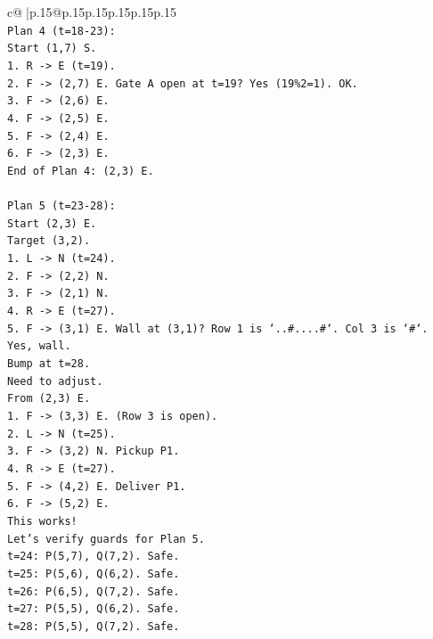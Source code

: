 \documentclass{article}
\begin{document}
{\begin{supertabular}{c@{$\;$}|p{.15\linewidth}@{}p{.15\linewidth}p{.15\linewidth}p{.15\linewidth}p{.15\linewidth}p{.15\linewidth}}
{{{\\ 
\texttt{Plan 4 (t=18{-}23):} \\
\texttt{Start (1,7) S.} \\
\texttt{1. R {-}> E (t=19).} \\
\texttt{2. F {-}> (2,7) E. Gate A open at t=19? Yes (19\%2=1). OK.} \\
\texttt{3. F {-}> (2,6) E.} \\
\texttt{4. F {-}> (2,5) E.} \\
\texttt{5. F {-}> (2,4) E.} \\
\texttt{6. F {-}> (2,3) E.} \\
\texttt{End of Plan 4: (2,3) E.} \\
\\ 
\texttt{Plan 5 (t=23{-}28):} \\
\texttt{Start (2,3) E.} \\
\texttt{Target (3,2).} \\
\texttt{1. L {-}> N (t=24).} \\
\texttt{2. F {-}> (2,2) N.} \\
\texttt{3. F {-}> (2,1) N.} \\
\texttt{4. R {-}> E (t=27).} \\
\texttt{5. F {-}> (3,1) E. Wall at (3,1)? Row 1 is `..\#....\#`. Col 3 is `\#`. Yes, wall.} \\
\texttt{Bump at t=28.} \\
\texttt{Need to adjust.} \\
\texttt{From (2,3) E.} \\
\texttt{1. F {-}> (3,3) E. (Row 3 is open).} \\
\texttt{2. L {-}> N (t=25).} \\
\texttt{3. F {-}> (3,2) N. Pickup P1.} \\
\texttt{4. R {-}> E (t=27).} \\
\texttt{5. F {-}> (4,2) E. Deliver P1.} \\
\texttt{6. F {-}> (5,2) E.} \\
\texttt{This works!} \\
\texttt{Let's verify guards for Plan 5.} \\
\texttt{t=24: P(5,7), Q(7,2). Safe.} \\
\texttt{t=25: P(5,6), Q(6,2). Safe.} \\
\texttt{t=26: P(6,5), Q(7,2). Safe.} \\
\texttt{t=27: P(5,5), Q(6,2). Safe.} \\
\texttt{t=28: P(5,5), Q(7,2). Safe.} \\
}}}
\end{supertabular}}
\end{document}
